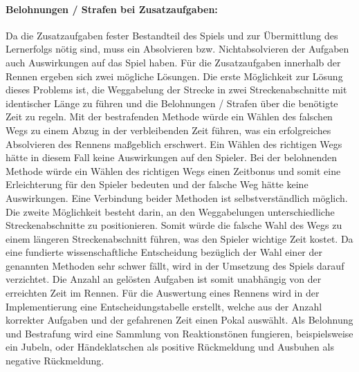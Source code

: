 		\paragraph{Belohnungen / Strafen bei Zusatzaufgaben:}
		Da die Zusatzaufgaben fester Bestandteil des Spiels und zur Übermittlung des Lernerfolgs nötig sind, muss ein Absolvieren bzw. Nichtabsolvieren der Aufgaben auch Auswirkungen auf das Spiel haben. Für die Zusatzaufgaben innerhalb der Rennen ergeben sich zwei mögliche Lösungen.
		Die erste Möglichkeit zur Lösung dieses Problems ist, die Weggabelung der Strecke in zwei Streckenabschnitte mit identischer Länge zu führen und die Belohnungen / Strafen über die benötigte Zeit zu regeln. Mit der bestrafenden Methode würde ein Wählen des falschen Wegs zu einem Abzug in der verbleibenden Zeit führen, was ein erfolgreiches Absolvieren des Rennens maßgeblich erschwert. Ein Wählen des richtigen Wegs hätte in diesem Fall keine Auswirkungen auf den Spieler.
		Bei der belohnenden Methode würde ein Wählen des richtigen Wegs einen Zeitbonus und somit eine Erleichterung für den Spieler bedeuten und der falsche Weg hätte keine Auswirkungen. Eine Verbindung beider Methoden ist selbstverständlich möglich.
		Die zweite Möglichkeit besteht darin, an den Weggabelungen unterschiedliche Streckenabschnitte zu positionieren. Somit würde die falsche Wahl des Wegs zu einem längeren Streckenabschnitt führen, was den Spieler wichtige Zeit kostet.
		Da eine fundierte wissenschaftliche Entscheidung bezüglich der Wahl einer der genannten Methoden sehr schwer fällt, wird in der Umsetzung des Spiels darauf verzichtet.
		Die Anzahl an gelösten Aufgaben ist somit unabhängig von der erreichten Zeit im Rennen. Für die Auswertung eines Rennens wird in der Implementierung eine Entscheidungstabelle erstellt, welche aus der Anzahl korrekter Aufgaben und der gefahrenen Zeit einen Pokal auswählt.
		Als Belohnung und Bestrafung wird eine Sammlung von Reaktionstönen fungieren, beispielsweise ein Jubeln, oder Händeklatschen als positive Rückmeldung und Ausbuhen als negative Rückmeldung.

